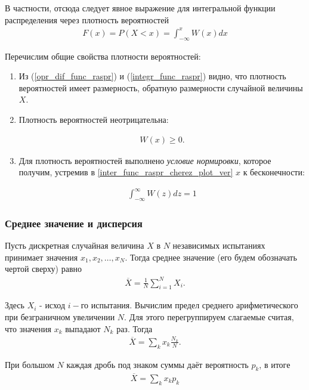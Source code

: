 В частности, отсюда следует явное выражение для интегральной функции распределения через плотность вероятностей 
 \begin{align} \label{inter_func_raspr_cherez_plot_ver}
 	F(x) = P(X < x) = \int_{-\infty}^{x}{W(x)dx}
 \end{align}
 
 Перечислим общие свойства плотности вероятностей:
 \begin{enumerate}
 	\item Из (\ref{opr_dif_func_raspr}) и (\ref{integr_func_raspr}) видно, что плотность вероятностей имеет размерность, обратную размерности случайной величины $X$.
 	\item 
 	{ 
 		Плотность вероятностей неотрицательна:
 		
 		\begin{align}
 			W(x) \geq 0.
 		\end{align}
 	}
 	\item 
 	{
 		Для плотность вероятностей выполнено \textit{условие нормировки}, которое получим, устремив в \eqref{inter_func_raspr_cherez_plot_ver} $x$ к бесконечности:
 		
 		\begin{align} \label{usl_normirovki}
 			\int_{-\infty}^{\infty}{W(z)dz} = 1
 		\end{align}
 	}
 \end{enumerate}
 
 
 \subsubsection{Среднее значение и дисперсия}
 Пусть дискретная случайная величина $X$ в $N$ независимых испытаниях принимает значения $x_1,x_2, \dots, x_N$. Тогда среднее значение (его будем обозначать чертой сверху) равно
 \begin{align} \label{sr_znach}
 	\overline X = \frac{1}{N} \sum_{i=1}^{N}X_i.
 \end{align}
 
 Здесь $X_i$ - исход $i-$го испытания. Вычислим предел среднего арифметического при безграничном увеличении $N$. Для этого перегруппируем слагаемые считая, что значения $x_k$ выпадают $N_k$ раз. Тогда
 \begin{align}
 	\overline X = \sum_{k}{x_k \frac{N_k}{N}}.
 \end{align}
 
 При большом $N$ каждая дробь под знаком суммы даёт вероятность $p_k$, в итоге 
 \begin{align} \tag{12a} \label{x_sr_sum}
 	\overline X = \sum_{k}{x_k p_k} 
 \end{align}
 
